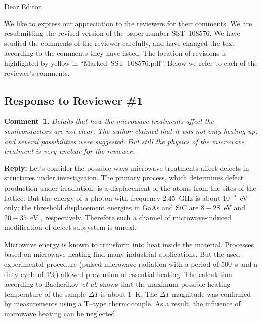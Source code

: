 \documentclass[10pt]{iopart}
\begin{document}
Dear Editor,

We like to express our appreciation to the reviewers for their comments.
We are resubmitting the revised version of the paper number SST--108576.
We have studied the comments of the reviewer carefully, and have changed the text according to the comments they
have listed.
The location of revisions is  highlighted by yellow in ``Marked--SST--108576.pdf''.
Below we refer to each of the reviewer’s comments.



\subsection*{Response to Reviewer \#1 }

\noindent
\textcolor[rgb]{0.00,0.50,1.00}{\textbf{Comment~1.}}
\emph{Details that how the microwave treatments affect the semiconductors are not clear.
The author claimed that it was not only heating up, and several possibilities were suggested.
But still the physics of the microwave treatment is very unclear for the reviewer.}

\noindent
\textcolor[rgb]{0.51,0.00,0.00}{\textbf{Reply:}}
Let's consider the possible ways microwave treatments affect defects in structures under investigation.
The primary process, which determines defect production under irradiation,
is a displacement of the atoms from the sites of the lattice.
But the energy of a photon with frequency 2.45~GHz is about $10^{-5}$~eV only;
the threshold displacement energies in GaAs and SiC are $8-28$~eV \cite{Ed:GaAs} and $20-35$~eV \cite{Ed:SiC}, respectively.
Therefore such a channel of microwave-induced modification of defect subsystem is unreal.

Microwave energy is known to transform into heat inside the material.
Processes based on microwave heating find many industrial applications.
But the used experimental procedure
(pulsed microwave radiation with a period of 500~s and a duty cycle of 1\%)
allowed prevention of essential heating.
The calculation according to Bacherikov~\emph{et al}. \cite{Bacherikov2008En} shows that
the maximum possible heating temperature of the sample $\Delta T$ is about 1~K.
The $\Delta T$ magnitude was confirmed by measurements using a T--type thermocouple.
As a result, the influence of microwave heating can be neglected.
\end{document}
